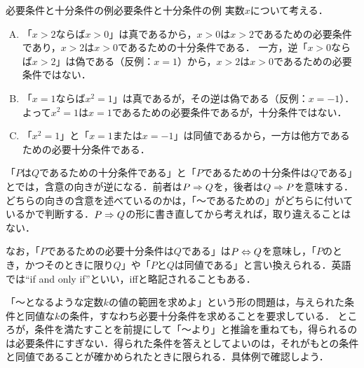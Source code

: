 \begin{example}{必要条件と十分条件の例}{必要条件と十分条件の例}
  実数$x$について考える．
  \begin{enumerate}[(A)]
    \item 「$x > 2$ならば$x > 0$」は真であるから，$x > 0$は$x > 2$であるための必要条件であり，$x > 2$は$x > 0$であるための十分条件である．
          一方，逆「$x > 0$ならば$x > 2$」は偽である（反例：$x = 1$）から，$x > 2$は$x > 0$であるための必要条件ではない．
    \item 「$x = 1$ならば$x^2 = 1$」は真であるが，その逆は偽である（反例：$x = -1$）．よって$x^2 = 1$は$x = 1$であるための必要条件であるが，十分条件ではない．
    \item 「$x^2 = 1$」と「$x = 1$または$x = -1$」は同値であるから，一方は他方であるための必要十分条件である．
  \end{enumerate}
\end{example}

\begin{remark}
  「$P$は$Q$であるための十分条件である」と「$P$であるための十分条件は$Q$である」とでは，含意の向きが逆になる．前者は$P \mathrel{\Rightarrow} Q$を，後者は$Q \mathrel{\Rightarrow} P$を意味する．
  どちらの向きの含意を述べているのかは，「〜であるための」がどちらに付いているかで判断する．$P \mathrel{\Rightarrow} Q$の形に書き直してから考えれば，取り違えることはない．

  なお，「$P$であるための必要十分条件は$Q$である」は$P \mathrel{\Leftrightarrow} Q$を意味し，「$P$のとき，かつそのときに限り$Q$」や「$P$と$Q$は同値である」と言い換えられる．英語では``if and only if''といい，iffと略記されることもある．
\end{remark}

「〜となるような定数$k$の値の範囲を求めよ」という形の問題は，与えられた条件と同値な$k$の条件，すなわち必要十分条件を求めることを要求している．
ところが，条件を満たすことを前提にして「〜より」と推論を重ねても，得られるのは必要条件にすぎない．得られた条件を答えとしてよいのは，それがもとの条件と同値であることが確かめられたときに限られる．具体例で確認しよう．

